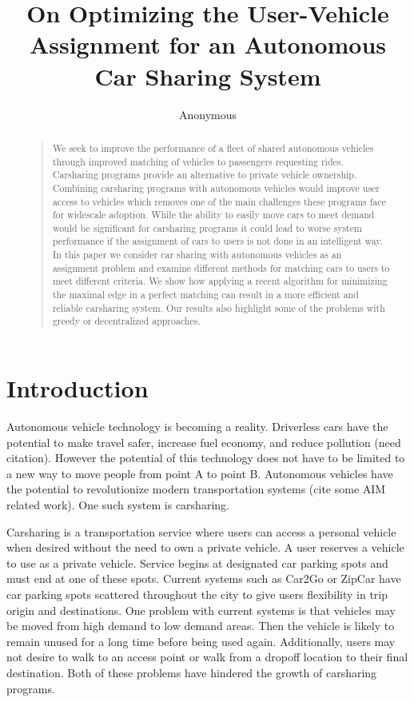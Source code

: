 \documentclass[letterpaper]{article}
\begin{document}
%
\title{On Optimizing the User-Vehicle Assignment for an Autonomous Car Sharing System}
\author{Anonymous}
\maketitle
\begin{abstract}
\begin{quote}
We seek to improve the performance of a fleet of shared autonomous vehicles through improved matching of vehicles to passengers requesting rides. Carsharing programs provide an alternative to private vehicle ownership. Combining carsharing programs with autonomous vehicles would improve user access to vehicles which removes one of the main challenges these programs face for widescale adoption. While the ability to easily move cars to meet demand would be significant for carsharing programs it could lead to worse system performance if the assignment of cars to users is not done in an intelligent way. In this paper we consider car sharing with autonomous vehicles as an assignment problem and examine different methods for matching cars to users to meet different criteria. We show how applying a recent algorithm for minimizing the maximal edge in a perfect matching can result in a more efficient and reliable carsharing system. Our results also highlight some of the problems with greedy or decentralized approaches.
\end{quote}
\end{abstract}

\noindent 

\section{Introduction}
Autonomous vehicle technology is becoming a reality. Driverless cars have the potential to make travel safer, increase fuel economy, and reduce pollution (need citation). However the potential of this technology does not have to be limited to a new way to move people from point A to point B. Autonomous vehicles have the potential to revolutionize modern transportation systems (cite some AIM related work). One such system is carsharing.

Carsharing is a transportation service where users can access a personal vehicle when desired without the need to own a private vehicle. A user reserves a vehicle to use as a private vehicle. Service begins at designated car parking spots and must end at one of these spots. Current systems such as Car2Go or ZipCar have car parking spots scattered throughout the city to give users flexibility in trip origin and destinations. One problem with current systems is that vehicles may be moved from high demand to low demand areas. Then the vehicle is likely to remain unused for a long time before being used again. Additionally, users may not desire to walk to an access point or walk from a dropoff location to their final destination. Both of these problems have hindered the growth of carsharing programs.
\end{document}
